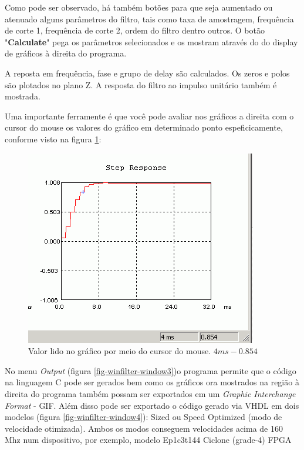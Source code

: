 		Como pode ser observado, há também botões para que seja aumentado ou atenuado alguns parâmetros do filtro, tais como taxa de amostragem, frequência de corte 1, frequência de corte 2, ordem do filtro dentro outros. O botão "\textbf{Calculate}" pega os parâmetros selecionados e os mostram através do do display de gráficos à direita do programa.
		
		A reposta em frequência, fase e grupo de delay são calculados. Os zeros e polos são plotados no plano Z. A resposta do filtro ao impulso unitário também é mostrada. 
		
		Uma importante ferramente é que você pode avaliar nos gráficos a direita com o cursor do mouse os valores do gráfico em determinado ponto espeficicamente, conforme visto na figura \ref{fig-winfilter-window2}:
		
		\begin{figure}[!ht]
			\label{fig-winfilter-window2}
			\centering
			\includegraphics[scale=0.5]{./figuras/cursor.png}
			\caption{Valor lido no gráfico por meio do cursor do mouse. $ 4ms - 0.854 $}
		\end{figure}
	
		No menu \textit{Output} (figura \ref{fig-winfilter-window3})o programa permite que o código na linguagem C pode ser gerados bem como os gráficos ora mostrados na região à direita do programa também possam ser exportados em um \textit{Graphic Interchange Format} - GIF. Além disso pode ser exportado o código gerado via VHDL em dois modelos (figura \ref{fig-winfilter-window4}): Sized ou Speed Optimized (modo de velocidade otimizada). Ambos os modos conseguem velocidades acima de 160 Mhz num dispositivo, por exemplo, modelo Ep1c3t144 Ciclone (grade-4) FPGA
		
